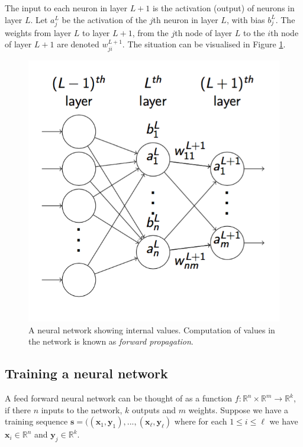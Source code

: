 \documentclass[12pt,twoside,notitlepage]{report}
\newcommand{\vc}[1]{\mathbf{#1}}
\newcommand{\bb}[1]{\mathbb{#1}}
\begin{document}
                The input to each neuron in layer $L+1$ is the activation (output) of neurons in layer $L$.
                Let $a_j^L$ be the activation of the $j$th neuron in layer $L$, with bias $b_j^L$. The weights from layer $L$ to 
                layer $L+1$, from the $j$th node of layer $L$ to the $i$th node of layer $L+1$ are denoted $w_{ji}^{L+1}$. The 
                situation can be visualised in Figure \ref{fig:feedforwardNetwork}.

                \begin{figure}
                    \centering
                    \includegraphics[scale=0.5]{neuralnetwork_with_vals}
                    \caption[A neural network showing internal values.]{A neural network showing internal values. Computation of values in the network is known as \textit{forward propagation}.}
                    \label{fig:feedforwardNetwork}
                \end{figure}


            \subsection{Training a neural network}

                A feed forward neural network can be thought of as a function $f:\bb{R}^n \times \bb{R}^m \rightarrow \bb{R}^k$, 
                if there $n$ inputs to the network, $k$ outputs and $m$ weights. Suppose we have a training sequence $\vc{s} = 
                ((\vc{x}_1, \vc{y}_1), ..., (\vc{x}_\ell, \vc{y}_\ell)$ where for each $1\leq i \leq \ell$ we have $\vc{x}_i 
                \in \bb{R}^n$ and $\vc{y}_j \in \bb{R}^k$. 
\end{document}
